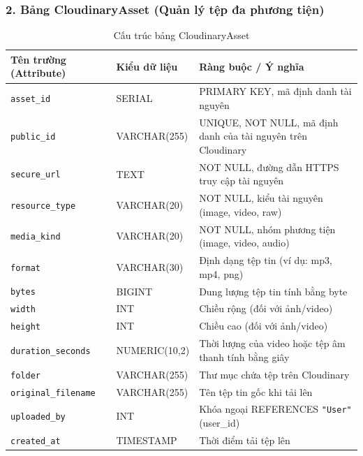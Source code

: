 \documentclass[../DoAn.tex]{subfiles}
\begin{document}
\subsubsection*{2. Bảng CloudinaryAsset (Quản lý tệp đa phương tiện)}
\begin{table}[H]
\centering
\footnotesize
\renewcommand{\arraystretch}{1.2}
\begin{tabular}{|p{4.2cm}|p{3.2cm}|p{7.1cm}|}
\hline
\textbf{Tên trường (Attribute)} & \textbf{Kiểu dữ liệu} & \textbf{Ràng buộc / Ý nghĩa} \\
\hline
\texttt{asset\_id} & SERIAL & PRIMARY KEY, mã định danh tài nguyên \\
\hline
\texttt{public\_id} & VARCHAR(255) & UNIQUE, NOT NULL, mã định danh của tài nguyên trên Cloudinary \\
\hline
\texttt{secure\_url} & TEXT & NOT NULL, đường dẫn HTTPS truy cập tài nguyên \\
\hline
\texttt{resource\_type} & VARCHAR(20) & NOT NULL, kiểu tài nguyên (image, video, raw) \\
\hline
\texttt{media\_kind} & VARCHAR(20) & NOT NULL, nhóm phương tiện (image, video, audio) \\
\hline
\texttt{format} & VARCHAR(30) & Định dạng tệp tin (ví dụ: mp3, mp4, png) \\
\hline
\texttt{bytes} & BIGINT & Dung lượng tệp tin tính bằng byte \\
\hline
\texttt{width} & INT & Chiều rộng (đối với ảnh/video) \\
\hline
\texttt{height} & INT & Chiều cao (đối với ảnh/video) \\
\hline
\texttt{duration\_seconds} & NUMERIC(10,2) & Thời lượng của video hoặc tệp âm thanh tính bằng giây \\
\hline
\texttt{folder} & VARCHAR(255) & Thư mục chứa tệp trên Cloudinary \\
\hline
\texttt{original\_filename} & VARCHAR(255) & Tên tệp tin gốc khi tải lên \\
\hline
\texttt{uploaded\_by} & INT & Khóa ngoại REFERENCES \texttt{"User"}(user\_id) \\
\hline
\texttt{created\_at} & TIMESTAMP & Thời điểm tải tệp lên \\
\hline
\end{tabular}
\caption{Cấu trúc bảng CloudinaryAsset}
\label{tab:schema_cloudinaryasset}
\end{table}
\end{document}
